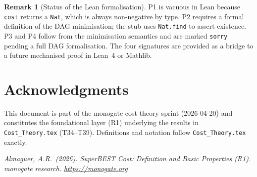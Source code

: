 \documentclass[12pt,a4paper]{article}
\theoremstyle{definition}
\newtheorem{remark}[theorem]{Remark}
\begin{document}
\begin{remark}[Status of the Lean formalisation]
P1 is vacuous in Lean because \texttt{cost} returns a \texttt{Nat}, which is
always non-negative by type.  P2 requires a formal definition of the DAG
minimisation; the stub uses \texttt{Nat.find} to assert existence.  P3 and P4
follow from the minimisation semantics and are marked \texttt{sorry} pending a
full DAG formalisation.  The four signatures are provided as a bridge to a
future mechanised proof in Lean~4 or Mathlib.
\end{remark}

\section*{Acknowledgments}

This document is part of the monogate cost theory sprint (2026-04-20) and
constitutes the foundational layer (R1) underlying the results in
\texttt{Cost\_Theory.tex} (T34--T39).  Definitions and notation follow
\texttt{Cost\_Theory.tex} exactly.

\bigskip
\noindent\textit{Almaguer, A.R.\ (2026).
SuperBEST Cost: Definition and Basic Properties (R1).
monogate research. \url{https://monogate.org}}
\end{document}
